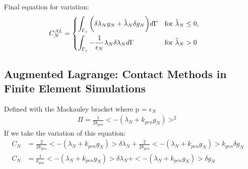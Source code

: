 \documentclass[12pt,3p]{article}
\begin{document}
Final equation for variation: 
\begin{align}\label{659}
C_{N}^{AL} &= 
\begin{dcases}
    \int_{\Gamma_c} \bigg( \delta \lambda_N g_N + \hat{\lambda}_N \delta g_N \bigg) d \Gamma & \text{for } \hat{\lambda}_N \leq 0, \\
    \int_{\Gamma_c} -\frac{1}{\epsilon_N} \lambda_N \delta \lambda_N d \Gamma               & \text{for } \hat{\lambda}_N > 0
\end{dcases}
\end{align}

\subsection{Augmented Lagrange: Contact Methods in Finite Element Simulations}
Defined with the Mackauley bracket where p = $\epsilon_N$
\begin{align*}
\Pi = \frac{1}{2 k_{pen}} < - (\lambda_N + k_{pen} g_N) >^2
\end{align*}
If we take the variation of this equation:
\begin{align*}
C_N &= \frac{2}{2 k_{pen}} <- (\lambda_N + k_{pen} g_N)> \delta \lambda_N + \frac{2}{2 k_{pen}} <-(\lambda_N + k_{pen} g_N) > k_{pen} \delta g_N \\
C_N &= \frac{1}{k_{pen}} <- (\lambda_N + k_{pen} g_N)> \delta \lambda_N + <-(\lambda_N + k_{pen} g_N) > \delta g_N
\end{align*}
\end{document}

